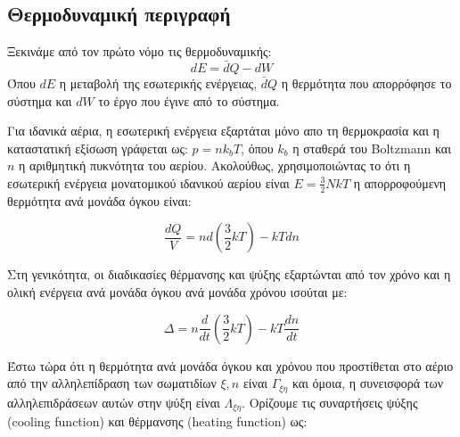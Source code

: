 \subsection{Θερμοδυναμική περιγραφή}
Ξεκινάμε από τον πρώτο νόμο τις θερμοδυναμικής:
\begin{equation}
dE = \bar{d}Q - dW
\end{equation}
Όπου $dE$ η μεταβολή της εσωτερικής ενέργειας, $\bar{d}Q$ η θερμότητα που απορρόφησε το σύστημα και $dW$ το έργο που έγινε από το σύστημα.

%
Για ιδανικά αέρια, η εσωτερική ενέργεια εξαρτάται μόνο απο τη θερμοκρασία και η καταστατική εξίσωση γράφεται ως: $p=nk_bT$, όπου $k_b$ η σταθερά του Boltzmann και $n$ η αριθμητική πυκνότητα του αερίου. Ακολούθως, 
χρησιμοποιώντας το ότι η εσωτερική ενέργεια μονατομικού ιδανικού αερίου είναι $E = \frac{3}{2}NkT$ η απορροφούμενη θερμότητα ανά μονάδα όγκου είναι:

\begin{equation}
\frac{dQ}{V}=nd\left(\frac{3}{2}kT \right)-kTdn
\end{equation}

Στη γενικότητα, οι διαδικασίες θέρμανσης και ψύξης εξαρτώνται από τον χρόνο και η ολική ενέργεια ανά μονάδα όγκου ανά μονάδα χρόνου ισούται με:

\begin{equation}
\label{eq:CoolingHeating}
\Delta = n\frac{d}{dt}\left(\frac{3}{2}kT \right)-kT\frac{dn}{dt}
\end{equation}


Έστω τώρα ότι η θερμότητα ανά μονάδα όγκου και χρόνου που προστίθεται στο αέριο από την αλληλεπίδραση των σωματιδίων $\xi,n$ είναι $\Gamma_{\xi \eta}$ και όμοια, η συνεισφορά των αλληλεπιδράσεων αυτών στην ψύξη είναι $\Lambda_{\xi \eta} $. Ορίζουμε τις συναρτήσεις ψύξης (cooling function) και θέρμανσης (heating function) ως:

